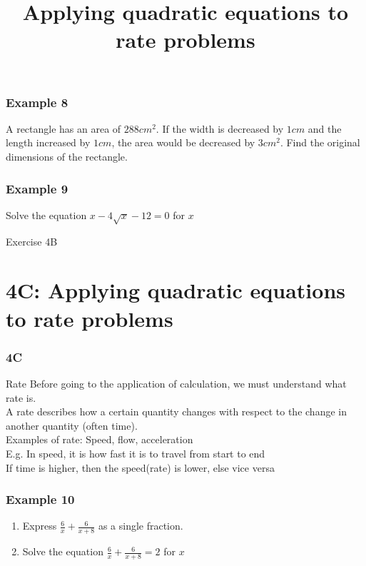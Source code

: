 \documentclass{beamer}
\begin{document}
\begin{frame}[t]
    \frametitle{Example 8}
    A rectangle has an area of $288 cm^2$. If the width is decreased by $1cm$ and the length increased by $1cm$, the area would be decreased by
    $3cm^2$. Find the original dimensions of the rectangle.
    
\end{frame}

\begin{frame}[t]
    \frametitle{Example 9}
    Solve the equation $x - 4\sqrt{x} - 12 = 0$ for $x$ 
\end{frame}

\begin{frame}{Exercise 4B}
\end{frame}
\section{4C: Applying quadratic equations to rate problems}
\begin{frame} 
    \frametitle{4C}
    \begin{center}
        \title{Applying quadratic equations to rate problems}
        \maketitle
    \end{center}
\end{frame}

\begin{frame}{Rate}
    Before going to the application of calculation, we must understand what rate is.\\
    A rate describes how a certain quantity changes with respect to the change in another quantity (often time).\\
    Examples of rate: Speed, flow, acceleration\\
    E.g. In speed, it is how fast it is to travel from start to end\\
    If time is higher, then the speed(rate) is lower, else vice versa
\end{frame}

\begin{frame}[t]
    \frametitle{Example 10}
    \begin{enumerate}
        \item Express $\frac{6}{x} + \frac{6}{x+8}$ as a single fraction.
        \item Solve the equation $\frac{6}{x} + \frac{6}{x+8} = 2$ for $x$
    \end{enumerate}
\end{frame}
\end{document}
